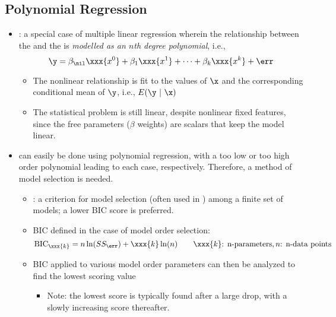 \begin{itemize}
  \subsection{Polynomial Regression}
  \begin{itemize}
    \item {}: a special case of multiple linear regression wherein the relationship between the  and the  is \emph{modelled as an \(n\)th degree polynomial}, i.e.,
    \[%
    \y = \beta_\nil \xxx{x^0} + \beta_1 \xxx{x^1} + \cdots + \beta_k \xxx{x^k} + \err
    \]%
      \begin{itemize}
        \item The nonlinear relationship is fit to the values of \(\x\) and the corresponding conditional mean of \(\y\), i.e., \(E(\y~|~\x)\)
        \item The statistical problem is still linear, despite nonlinear fixed features, since the free parameters (\(\beta \) weights) are scalars that keep the model linear. 
      \end{itemize}
      \item \hyperref[Subsection: Primer: Cross-Validation]{} can easily be done using polynomial regression, with a too low or too high order polynomial leading to each case, respectively. Therefore, a method of model selection is needed.
        \begin{itemize}
          \item {}: a criterion for model selection (often used in \hyperref[Subsection: Primer: Cross-Validation]{}) among a finite set of models; a lower BIC score is preferred.
          \item BIC defined in the case of model order selection:
          \[%
          \operatorname{BIC}_\xxx{k} = n \ln(SS_\err) + \xxx{k}\ln(n) \qquad \xxx{k}\text{: n-parameters}, n\text{: n-data points}
          \]%
          \item BIC applied to various model order parameters can then be analyzed to find the lowest scoring value 
            \begin{itemize}
              \item Note: the lowest score is typically found after a large drop, with a slowly increasing score thereafter.
            \end{itemize}
        \end{itemize}
  \end{itemize}
  

\end{itemize}
